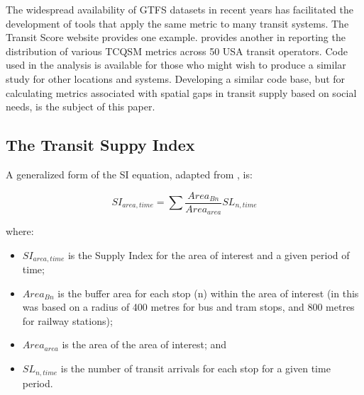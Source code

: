 \documentclass[preprint, 3p,
authoryear]{elsarticle} %
\begin{document}
The widespread availability of GTFS datasets in recent years has
facilitated the development of tools that apply the same metric to many
transit systems. The Transit Score website provides one example.
\citet{Wong:2013aa} provides another in reporting the distribution of
various TCQSM metrics across 50 USA transit operators. Code used in the
\citet{Wong:2013aa} analysis is available for those who might wish to
produce a similar study for other locations and systems. Developing a
similar code base, but for calculating metrics associated with spatial
gaps in transit supply based on social needs, is the subject of this
paper.

\hypertarget{the-transit-suppy-index}{%
\subsection{The Transit Suppy Index}\label{the-transit-suppy-index}}

A generalized form of the SI equation, adapted from
\citet{currie2010identifying}, is:

\[SI_{area, time} = \sum{\frac{Area_{Bn}}{Area_{area}}SL_{n, time}}\]

where:

\begin{itemize}
\item
  \(SI_{area, time}\) is the Supply Index for the area of interest and a
  given period of time;
\item
  \(Area_{Bn}\) is the buffer area for each stop (n) within the area of
  interest (in \citet{currie2010identifying} this was based on a radius
  of 400 metres for bus and tram stops, and 800 metres for railway
  stations);
\item
  \(Area_{area}\) is the area of the area of interest; and
\item
  \(SL_{n,time}\) is the number of transit arrivals for each stop for a
  given time period.
\end{itemize}
\end{document}
